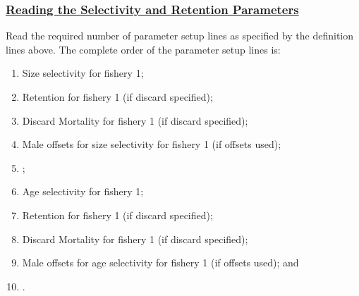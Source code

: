 \subsubsection[Reading the Selectivity and Retention Parameters]{\protect\hyperlink{SelRetParam}{Reading the Selectivity and Retention Parameters}}
Read the required number of parameter setup lines as specified by the definition lines above. The complete order of the parameter setup lines is:
\begin{enumerate}
	\item Size selectivity for fishery 1;
	\item Retention for fishery 1 (if discard specified);
	\item Discard Mortality for fishery 1 (if discard specified);
	\item Male offsets for size selectivity for fishery 1 (if offsets used);
	\item <repeat for additional fleets and surveys>;
	\item Age selectivity for fishery 1;
	\item Retention for fishery 1 (if discard specified);
	\item Discard Mortality for fishery 1 (if discard specified);
	\item Male offsets for age selectivity for fishery 1 (if offsets used); and
	\item <repeat for additional fleets and surveys>.
\end{enumerate}


